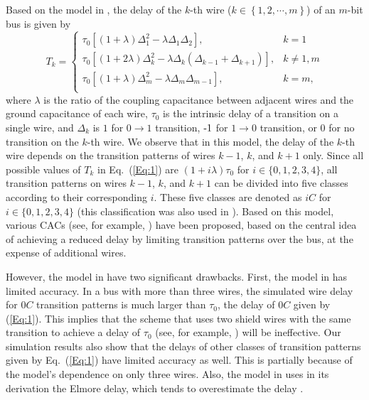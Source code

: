 \documentclass[10pt,journal]{IEEEtran}
\begin{document}
Based on the model in \cite{Sot01,Sot02}, the delay of the $k$-th wire ($k \in \left\{1,2,\cdots,m \right\}$) of an $m$-bit bus is given by
\begin{equation}
  T_k = \left\{
    \begin{array}{ll}
      \tau_0[(1+\lambda)\Delta_1^2-\lambda\Delta_1\Delta_2], & k=1\\
      \tau_0[(1+2\lambda)\Delta_k^2-\lambda\Delta_k(\Delta_{k-1}+\Delta_{k+1})],
      & k\neq 1,m\\
      \tau_0[(1+\lambda)\Delta_m^2-\lambda\Delta_m\Delta_{m-1}],& k=m,\\
    \end{array}
  \right.
  \label{Eq:1}
\end{equation}
where $\lambda$ is the ratio of the coupling capacitance between
adjacent wires and the ground capacitance of each wire,
$\tau_0$ is the intrinsic delay of a transition on a single wire,
and $\Delta_k$ is $1$ for $0\rightarrow 1$ transition, $\textnormal{-}1$ for
$1\rightarrow 0$ transition, or $0$ for no transition on the $k$-th
wire. We observe that in this model, the delay of the $k$-th wire
depends on the transition patterns of wires $k-1$, $k$, and $k+1$ only. Since all possible values of $T_k$ in Eq.~(\ref{Eq:1}) are $(1+i\lambda)\tau_0$ for $i \in \{0,1,2,3,4\}$, all transition patterns on wires $k-1$, $k$, and $k+1$ can be divided into five classes according to their corresponding $i$. These five classes are denoted as $iC$ for $i \in \{0,1,2,3,4\}$ (this classification was also used in \cite{Dua01}). Based on this model, various CACs (see, for example,  \cite{Dua01,Vic01,Sri07,Wu09}) have been proposed, based on the central idea of achieving a reduced delay by limiting transition patterns over the bus, at the expense of additional wires.


However, the model in \cite{Sot01} have two significant drawbacks. First, the model in \cite{Sot01} has limited accuracy. In a bus with more than three wires, the simulated wire delay for $0C$ transition patterns is much larger than $\tau_0$, the delay of $0C$ given by (\ref{Eq:1}). This implies that the scheme that uses two shield wires with the same transition to achieve a delay of $\tau_0$ (see, for example, \cite{Dua04}) will be ineffective. Our simulation results also show that the delays of other classes of transition patterns given by Eq.~(\ref{Eq:1}) have limited accuracy as well. This is partially because of the model's dependence on only three wires.
Also, the model in \cite{Sot01} uses in its derivation the Elmore delay, which tends to overestimate the delay \cite{Elm48,Gup97}.
\end{document}
